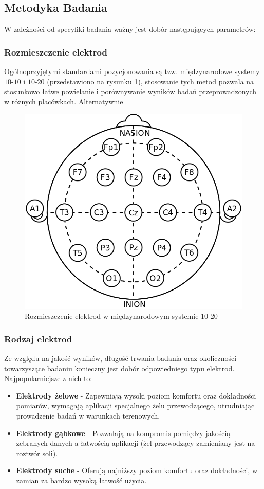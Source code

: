 \documentclass{./assets/wfis}
\begin{document}
\subsection{Metodyka Badania}

W zależności od specyfiki badania ważny jest dobór następujących parametrów:

\subsubsection{Rozmieszczenie elektrod}
Ogólnoprzyjętymi standardami pozycjonowania są tzw. międzynarodowe systemy $10$-$10$ i $10$-$20$ (przedstawiono na rysunku \ref{fig:10-20-system}), stosowanie tych metod pozwala na stosunkowo łatwe powielanie i porównywanie wyników badań przeprowadzonych w różnych placówkach. Alternatywnie 

\begin{figure}[h]
    \centering
    \includegraphics[width=0.5\columnwidth]{thesis/assets/10-20_system_electrodes.png}
    \caption{Rozmieszczenie elektrod w międzynarodowym systemie $10$-$20$}
    \label{fig:10-20-system}
\end{figure}

\subsubsection{Rodzaj elektrod}
Ze względu na jakość wyników, długość trwania badania oraz okoliczności towarzyszące badaniu konieczny jest dobór odpowiedniego typu elektrod. Najpopularniejsze z nich to:

\begin{itemize}
    \item \textbf{Elektrody żelowe} - Zapewniają wysoki poziom komfortu oraz dokładności pomiarów, wymagają aplikacji specjalnego żelu przewodzącego, utrudniając prowadzenie badań w warunkach terenowych.
    \item \textbf{Elektrody gąbkowe} - Pozwalają na kompromis pomiędzy jakością zebranych danych a łatwością aplikacji (żel przewodzący zamieniany jest na roztwór soli).
    \item \textbf{Elektrody suche} - Oferują najniższy poziom komfortu oraz dokładności, w zamian za bardzo wysoką łatwość użycia.
\end{itemize}
\end{document}

